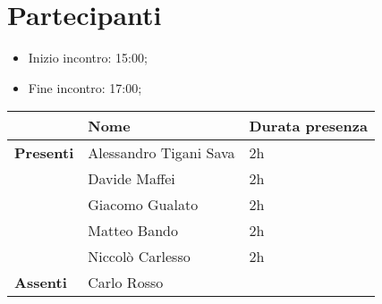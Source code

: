 \section{Partecipanti}

\begin{itemize}
    \item Inizio incontro: 15:00;
    \item Fine incontro: 17:00;
\end{itemize}


\begin{center}
	{\renewcommand{\arraystretch}{1.5}
	\begin{tabular}{lll}
							& \textbf{Nome}  & \textbf{Durata presenza} \\
		\hline
		\textbf{Presenti}   & Alessandro Tigani Sava 	& 2h     	\\
							& Davide Maffei				& 2h		\\
							& Giacomo Gualato			& 2h		\\
							& Matteo Bando				& 2h		\\
							& Niccolò Carlesso			& 2h		\\
		\hline
		\textbf{Assenti}	& Carlo Rosso				& 			\\
	\end{tabular}	
	}
	\end{center}